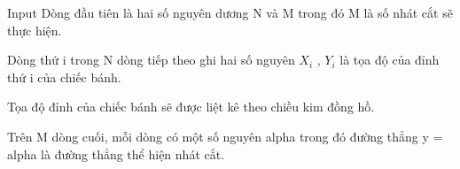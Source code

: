 Input
Dòng đầu tiên là hai số nguyên dương N và M trong đó M là số nhát cắt sẽ thực hiện.  

   Dòng thứ i trong N dòng tiếp theo ghi hai số nguyên $X_{i}$   , $Y_{i}$   là tọa độ của đỉnh thứ i của chiếc bánh.  

   Tọa độ đỉnh của chiếc bánh sẽ được liệt kê theo chiều kim đồng hồ.  

   Trên M dòng cuối, mỗi dòng có một số nguyên alpha trong đó đường thẳng y = alpha là đường thẳng thể hiện nhát cắt.